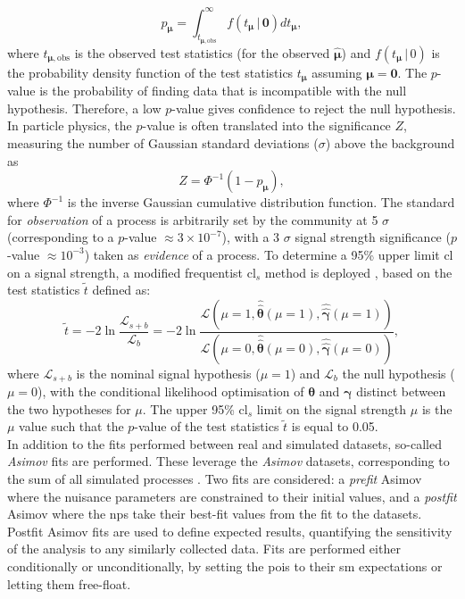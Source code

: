 \begin{equation}
    p_{\boldsymbol{\mu}}=\int_{t_{\boldsymbol{\mu},\mathrm{obs}}}^{\infty} f(t_{\boldsymbol{\mu}} \,| \, \boldsymbol{0}) dt_{\boldsymbol{\mu}},
\end{equation}
where $t_{\boldsymbol{\mu},\mathrm{obs}}$ is the observed test statistics (for the observed $\hat{\boldsymbol{\mu}}$) and $f(t_{\boldsymbol{\mu}} \,| \,0)$ is the probability density function of the test statistics $t_{\boldsymbol{\mu}}$ assuming $\boldsymbol{\mu} = \boldsymbol{0}$. The $p$-value is the probability of finding data that is incompatible with the null hypothesis. Therefore, a low $p$-value gives confidence to reject the null hypothesis. In particle physics, the $p$-value is often translated into the significance $Z$, measuring the number of Gaussian standard deviations ($\sigma$) above the background as
\begin{equation}
    Z = \Phi^{-1}(1-p_{\boldsymbol{\mu}}),
\end{equation}
where $\Phi^{-1}$ is the inverse Gaussian cumulative distribution function. The standard for \textit{observation} of a process is arbitrarily set by the community at 5 $\sigma$ (corresponding to a $p$-value $\approx 3 \times 10^{-7}$), with a 3 $\sigma$ signal strength significance ($p$-value $\approx 10^{-3}$) taken as \textit{evidence} of a process. To determine a 95\% upper limit \gls{cl} on a signal strength, a modified frequentist \gls{cl}$_s$ method is deployed \cite{asympForm, ALRead_2002}, based on the test statistics $\tilde{t}$ defined as:
\begin{equation}
    \tilde{t} = -2 \ln \frac{\mathcal{L}_{s+b}}{\mathcal{L}_{b}} = -2 \ln \frac{\mathcal{L}\left(\mu = 1, \hat{\hat{\boldsymbol{\theta}}}(\mu = 1), \hat{\hat{\boldsymbol{\gamma}}}(\mu = 1) \right)}{\mathcal{L}\left(\mu = 0, \hat{\hat{\boldsymbol{\theta}}}(\mu = 0), \hat{\hat{\boldsymbol{\gamma}}}(\mu = 0) \right)},
\end{equation}
where $\mathcal{L}_{s+b}$ is the nominal signal hypothesis ($\mu = 1$) and $\mathcal{L}_{b}$ the null hypothesis ($\mu = 0$), with the conditional likelihood optimisation of $\boldsymbol{\theta}$ and $\boldsymbol{\gamma}$ distinct between the two hypotheses for $\mu$. The upper 95\% \gls{cl}$_s$ limit on the signal strength $\mu$ is the $\mu$ value such that the $p$-value of the test statistics $\tilde{t}$ is equal to 0.05.\\

In addition to the fits performed between real and simulated datasets, so-called \textit{Asimov} fits are performed. These leverage the \textit{Asimov} datasets, corresponding to the sum of all simulated processes \cite{asympForm}. Two fits are considered: a \textit{prefit} Asimov where the nuisance parameters are constrained to their initial values, and a \textit{postfit} Asimov where the \glspl{np} take their best-fit values from the fit to the datasets. Postfit Asimov fits are used to define expected results, quantifying the sensitivity of the analysis to any similarly collected data. Fits are performed either conditionally or unconditionally, by setting the \glspl{poi} to their \gls{sm} expectations or letting them free-float. 

